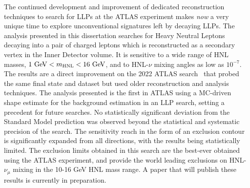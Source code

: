 The continued development and improvement of dedicated reconstruction techniques to search for LLPs at the ATLAS experiment makes \textit{now} a very unique time to explore unconventional signatures left by decaying LLPs.
The analysis presented in this dissertation searches for Heavy Neutral Leptons decaying into a pair of charged leptons which is reconstructed as a secondary vertex in the Inner Detector volume. It is sensitive to a wide range of HNL masses, $1\text{ GeV}<m_{\mathrm{HNL}}<16\text{ GeV}$, and to HNL-$\nu$ mixing angles as low as $10^{-7}$. The results are a direct improvement on the 2022 ATLAS search~\cite{PhysRevLett.131.061803} that probed the same final state and dataset but used older reconstruction and analysis techniques. The analysis presented is the first in ATLAS using a MC-driven shape estimate for the background estimation in an LLP search, setting a precedent for future searches. No statistically significant deviation from the Standard Model prediction was observed beyond the statistical and systematic precision of the search. The sensitivity reach in the form of an exclusion contour is significantly expanded from all directions, with the results being statistically limited. The exclusion limits obtained in this search are the best-ever obtained using the ATLAS experiment, and provide the world leading exclusions on HNL-$\nu_\mu$ mixing in the 10-16 GeV HNL mass range. A paper that will publish these results is currently in preparation.



